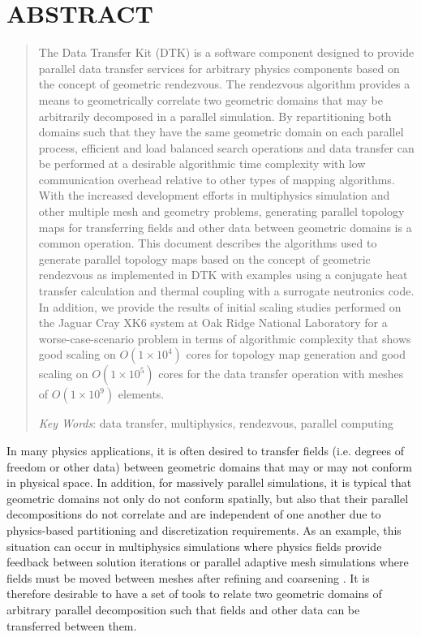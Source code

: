 \documentclass{mc2013}
\begin{document}
\section*{ABSTRACT} 
\begin{quote}
\begin{small}
The Data Transfer Kit (DTK) is a software component designed to
provide parallel data transfer services for arbitrary physics
components based on the concept of geometric rendezvous. The
rendezvous algorithm provides a means to geometrically correlate two
geometric domains that may be arbitrarily decomposed in a parallel
simulation. By repartitioning both domains such that they have the
same geometric domain on each parallel process, efficient and load
balanced search operations and data transfer can be performed at a
desirable algorithmic time complexity with low communication overhead
relative to other types of mapping algorithms. With the increased
development efforts in multiphysics simulation and other multiple mesh
and geometry problems, generating parallel topology maps for
transferring fields and other data between geometric domains is a
common operation. This document describes the algorithms used to
generate parallel topology maps based on the concept of geometric
rendezvous as implemented in DTK with examples using a conjugate heat
transfer calculation and thermal coupling with a surrogate neutronics
code. In addition, we provide the results of initial scaling studies
performed on the Jaguar Cray XK6 system at Oak Ridge National
Laboratory for a worse-case-scenario problem in terms of algorithmic
complexity that shows good scaling on $O(1 \times 10^4)$ cores for
topology map generation and good scaling on $O(1 \times 10^5)$ cores
for the data transfer operation with meshes of $O(1 \times 10^9)$
elements.


\emph{Key Words}: data transfer, multiphysics, rendezvous, parallel
computing
\end{small} 
\end{quote}

\setlength{\baselineskip}{14pt}
\normalsize

\label{sec:intro}

In many physics applications, it is often desired to transfer fields
(i.e. degrees of freedom or other data) between geometric domains that
may or may not conform in physical space. In addition, for massively
parallel simulations, it is typical that geometric domains not only do
not conform spatially, but also that their parallel decompositions do
not correlate and are independent of one another due to physics-based
partitioning and discretization requirements. As an example, this
situation can occur in multiphysics simulations where physics fields
provide feedback between solution iterations \cite{Tautges_2009_2} or
parallel adaptive mesh simulations where fields must be moved between
meshes after refining and coarsening \cite{Edwards_2006}. It is
therefore desirable to have a set of tools to relate two geometric
domains of arbitrary parallel decomposition such that fields and other
data can be transferred between them.
\end{document}
